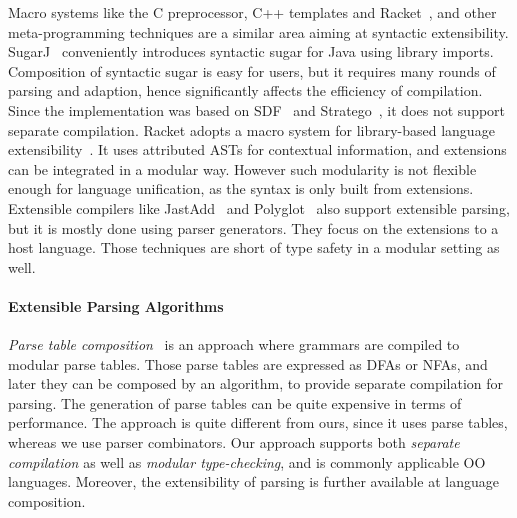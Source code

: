 Macro systems like the C preprocessor, C++ templates and
Racket~\cite{Tobin-Hochstadt2011}, and other meta-programming
techniques are a similar area aiming at syntactic extensibility.
SugarJ~\cite{Erdweg2011} conveniently introduces syntactic sugar for
Java using library imports. Composition of syntactic sugar is easy for
users, but it requires many rounds of parsing and adaption, hence
significantly affects the efficiency of compilation. Since the
implementation was based on SDF~\cite{Heering1989} and
Stratego~\cite{Visser2001}, it does not support separate
compilation. Racket adopts a macro system for library-based language
extensibility~\cite{Tobin-Hochstadt2011}. It uses
attributed ASTs for contextual
information, and extensions can be integrated in a modular
way. However such modularity is not flexible enough for language
unification, as the syntax is only built from extensions.
Extensible
compilers like JastAdd~\cite{Ekman2007} and
Polyglot~\cite{Nystrom2003} also support extensible parsing, but it
is mostly done using parser generators. They focus on the
extensions to a host language. Those techniques are short of type safety in a modular
setting as well.


\vspace{-6pt}
\paragraph{Extensible Parsing Algorithms}
\textit{Parse table composition}~\cite{bravenboer2008parse, schwerdfeger2010}
is an approach where grammars are compiled to
modular parse tables. Those parse tables are expressed as DFAs
or NFAs, and later they can be composed by an algorithm, to provide
separate compilation for parsing. The generation of parse tables can
be quite expensive in terms of performance. The approach
is quite different from ours, since it uses parse
 tables, whereas we use parser combinators.
Our approach supports both
\emph{separate compilation} as well as \emph{modular
  type-checking}, and is commonly applicable OO languages. Moreover, the extensibility of parsing is further
available at language composition.

